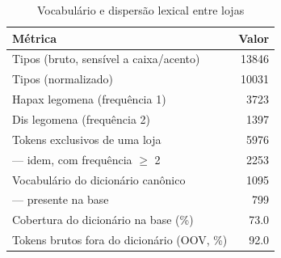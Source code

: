 \begin{table}[htbp]
\centering
\caption{Vocabulário e dispersão lexical entre lojas}
\label{tab:vocabulario}
\small
\begin{tabular}{lr}
\toprule
Métrica & Valor \\
\midrule
Tipos (bruto, sensível a caixa/acento) & 13846 \\
Tipos (normalizado) & 10031 \\
Hapax legomena (frequência 1) & 3723 \\
Dis legomena (frequência 2) & 1397 \\
Tokens exclusivos de uma loja & 5976 \\
— idem, com frequência $\geq$ 2 & 2253 \\
Vocabulário do dicionário canônico & 1095 \\
— presente na base & 799 \\
Cobertura do dicionário na base (\%) & 73.0 \\
Tokens brutos fora do dicionário (OOV, \%) & 92.0 \\
\bottomrule
\end{tabular}
\vspace{2mm}
\end{table}
